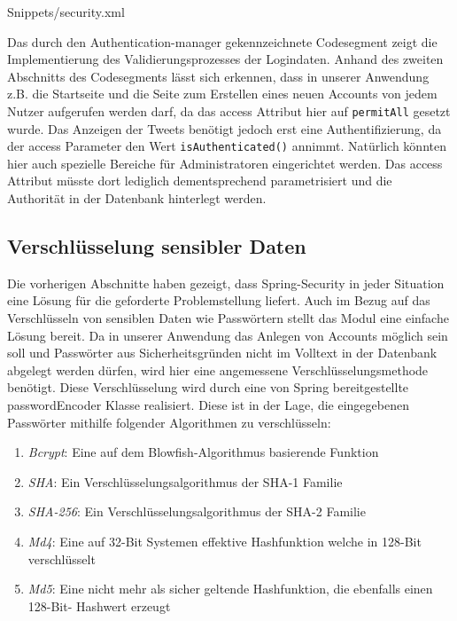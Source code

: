 {Snippets/security.xml}

Das durch den Authentication-manager gekennzeichnete Codesegment zeigt die Implementierung des 
Validierungsprozesses der Logindaten.
Anhand des zweiten Abschnitts des Codesegments lässt sich erkennen, dass in unserer Anwendung z.B. die 
Startseite und die Seite zum Erstellen eines neuen Accounts von jedem Nutzer aufgerufen werden darf, 
da das access Attribut hier auf \texttt{permitAll} gesetzt wurde. Das Anzeigen der Tweets benötigt 
jedoch erst eine Authentifizierung, da der access Parameter den Wert \texttt{isAuthenticated()} 
annimmt. Natürlich könnten hier auch spezielle Bereiche für Administratoren eingerichtet werden. Das 
access Attribut müsste dort lediglich dementsprechend parametrisiert  und die Authorität in der 
Datenbank hinterlegt werden.

\subsection{Verschlüsselung sensibler Daten}

Die vorherigen Abschnitte haben gezeigt, dass Spring-Security in jeder Situation eine Lösung für die 
geforderte Problemstellung liefert. Auch im Bezug auf das Verschlüsseln von sensiblen Daten wie 
Passwörtern stellt das Modul eine einfache Lösung bereit. Da in unserer Anwendung das Anlegen von 
Accounts möglich sein soll und Passwörter aus Sicherheitsgründen nicht im Volltext in der Datenbank 
abgelegt werden dürfen, wird hier eine angemessene Verschlüsselungsmethode benötigt. Diese 
Verschlüsselung wird durch eine von Spring bereitgestellte passwordEncoder Klasse realisiert. Diese 
ist in der Lage, die eingegebenen Passwörter mithilfe folgender Algorithmen zu verschlüsseln:

\begin{enumerate}
  \item \textit{Bcrypt}: Eine auf dem Blowfish-Algorithmus basierende Funktion
  \item \textit{SHA}: Ein Verschlüsselungsalgorithmus der SHA-1 Familie
  \item \textit{SHA-256}: Ein Verschlüsselungsalgorithmus der SHA-2 Familie
  \item \textit{Md4}: Eine auf 32-Bit Systemen effektive Hashfunktion welche in 128-Bit verschlüsselt
  \item \textit{Md5}: Eine nicht mehr als sicher geltende Hashfunktion, die ebenfalls einen 128-Bit- 	Hashwert erzeugt
\end{enumerate}

